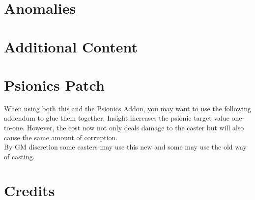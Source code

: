 \documentclass[11pt,a4paper,openany]{book}
\begin{document}
	\chapter{Anomalies}
	
	
	\chapter{Additional Content}
	
	
	\chapter{Psionics Patch}
	When using both this and the Psionics Addon, you may want to use the following addendum to glue them together: 
	Insight increases the psionic target value one-to-one. However, the cost now not only deals damage to the caster but will also cause the same amount of corruption.\\
	By GM discretion some casters may use this new and some may use the old way of casting.
	
	\chapter{Credits}
	
\end{document}

